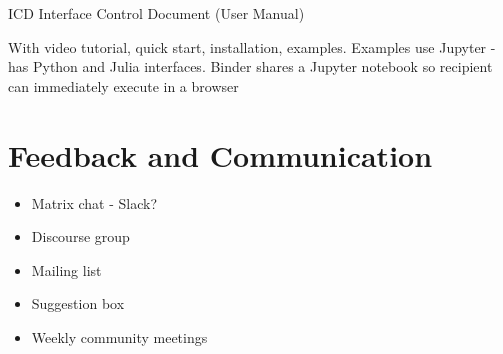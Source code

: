ICD Interface Control Document (User Manual)

With video tutorial, quick start, installation, examples. %
Examples use Jupyter - has Python and Julia interfaces. Binder shares a Jupyter notebook so
recipient can immediately execute in a browser

\clearpage
\section{Feedback and Communication}\label{sec:feedback}
\begin{itemize}
\item Matrix chat - Slack?
\item Discourse group
\item Mailing list
\item Suggestion box
\item Weekly community meetings
\end{itemize}
